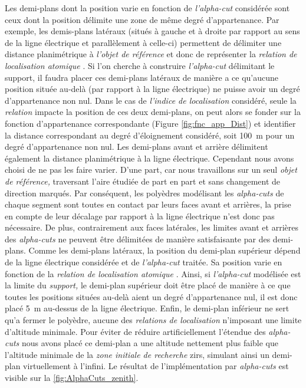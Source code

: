 Les demi-plans dont la position varie en fonction de
\emph{l'alpha-cut} considérée sont ceux dont la position délimite une
zone de même degré d'appartenance. Par exemple, les demis-plans
latéraux (\ie situés à gauche et à droite par rapport au sens de la
ligne électrique et parallèlement à celle-ci) permettent de délimiter
une distance planimétrique à \emph{l'objet de référence} et donc de
représenter la \emph{relation de localisation atomique}
. Si l'on cherche à construire \emph{l'alpha-cut}
délimitant le support, il faudra placer ces demi-plans latéraux de
manière a ce qu'aucune position située au-delà (par rapport à la ligne
électrique) ne puisse avoir un degré d'appartenance non nul. Dans le
cas de \emph{l'indice de localisation} considéré, seule la
\emph{relation}  impacte la position de ces deux
demi-plans, on peut alors se fonder sur la fonction d'appartenance
correspondante (Figure \ref{fig:fnc_app_Dist}) et identifier la
distance correspondant au degré d'éloignement considéré, soit
\SI{100}{\meter} pour un degré d'appartenance non nul. Les demi-plans
avant et arrière délimitent également la distance planimétrique à la
ligne électrique. Cependant nous avons choisi de ne pas les faire
varier. D'une part, car nous travaillons sur un seul \emph{objet de
  référence,} traversant l'aire étudiée de part en part et sans
changement de direction marqués. Par conséquent, les polyèdres
modélisant les \emph{alpha-cuts} de chaque segment sont toutes en
contact par leurs faces avant et arrières, la prise en compte de leur
décalage par rapport à la ligne électrique n'est donc pas
nécessaire. De plus, contrairement aux faces latérales, les limites
avant et arrières des \emph{alpha-cuts} ne peuvent être délimitées de
manière satisfaisante par des demi-plans.
% 
Comme les demi-plans latéraux, la position du demi-plan supérieur
dépend de la ligne électrique considérée et de \emph{l'alpha-cut}
traitée. Sa position varie en fonction de la \emph{relation de
  localisation atomique}
. Ainsi,
si \emph{l'alpha-cut} modélisée est la limite du \emph{support,} le
demi-plan supérieur doit être placé de manière à ce que toutes les
positions situées au-delà aient un degré d'appartenance nul, il est
donc placé \SI{5}{\meter} au-dessus de la ligne électrique.  Enfin, le
demi-plan inférieur ne sert qu'a fermer le polyèdre, aucune des
\emph{relations de localisation} n'imposant une limite d'altitude
minimale. Pour éviter de réduire artificiellement l'étendue des
\emph{alpha-cuts} nous avons placé ce demi-plan a une altitude
nettement plus faible que l'altitude minimale de la \emph{zone
  initiale de recherche} \acp{zir}, simulant ainsi un demi-plan
virtuellement à l'infini. Le résultat de l'implémentation par
\emph{alpha-cuts} est visible sur la \autoref{fig:AlphaCuts_zenith}.

